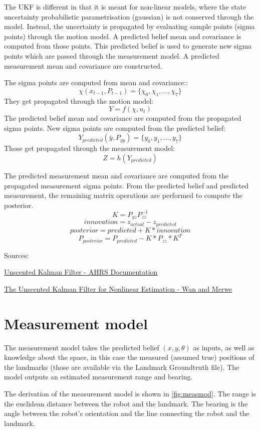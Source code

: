 \documentclass{article}
\begin{document}
The UKF is different in that it is meant for non-linear models, where the state uncertainty probabilistic parametrisation (gaussian) is not conserved through the model. Instead, the uncertainty is propagated by evaluating sample points (sigma points) through the motion model. A predicted belief mean and covariance is computed from those points. This predicted belief is used to generate new sigma points which are passed through the measurement model. A predicted measurement mean and covariance are constructed.

The sigma points are computed from mean and covariance::
\[\chi(x_{t-1},P_{t-1})=\{\chi_0, \chi_1, \dots, \chi_{7}\}\]
They get propagated through the motion model:
\[Y=f(\chi, u_t)\]
The predicted belief mean and covariance are computed from the propagated sigma points. New sigma points are computed from the predicted belief:
\[Y_{predicted}(\bar{y},P_{yy})=\{y_0, y_1, \dots, y_{7}\}\]
Those get propagated through the measurement model:
\[Z=h(Y_{predicted})\]

The predicted measurement mean and covariance are computed from the propagated measurement sigma points.
From the predicted belief and predicted measurement, the remaining matrix operations are performed to compute the posterior.
\[K=P_{yz}P_{zz}^{-1}\]
\[innovation=z_{actual}-z_{predicted}\]
\[posterior=predicted+K*innovation\]
\[P_{posterior}=P_{predicted}-K*P_{zz}*K^T\]

Sources: 

\href{https://ahrs.readthedocs.io/en/latest/filters/ukf.html}{Unscented Kalman Filter - AHRS Documentation}

\href{https://groups.seas.harvard.edu/courses/cs281/papers/unscented.pdf}{The Unscented Kalman Filter for Nonlinear Estimation - Wan and Merwe}

\section{Measurement model}

The measurement model takes the predicted belief $(x, y, \theta)$ as inputs, as well as knowledge about the space, in this case the measured (assumed true) positions of the landmarks (those are available via the Landmark Groundtruth file).
The model outputs an estimated measurement range and bearing.

The derivation of the measurement model is shown in \autoref{fig:measmod}. The range is the euclidean distance between the robot and the landmark. The bearing is the angle between the robot's orientation and the line connecting the robot and the landmark.
\end{document}
